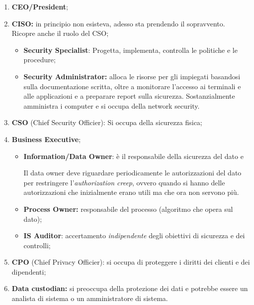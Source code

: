 \begin{enumerate}
  \item \textbf{CEO/President};
  \item \textbf{CISO:} in principio non esisteva, adesso sta prendendo il
  sopravvento. Ricopre anche il ruolo del CSO;
  \begin{itemize}
        \item \textbf{Security Specialist}: Progetta, implementa,
        controlla le politiche e le procedure;
        \item \textbf{Security Administrator:} alloca le risorse per gli
        impiegati basandosi sulla documentazione scritta, oltre a monitorare
        l'accesso ai terminali e alle applicazioni e a preparare report sulla
        sicurezza. Sostanzialmente amministra i computer e si occupa
        della network security.
  \end{itemize}
  \item \textbf{CSO} (Chief Security Officier): Si occupa della
  sicurezza fisica;
  \item \textbf{Business Executive};
  \begin{itemize}
  \item \textbf{Information/Data Owner}:
  è il responsabile della sicurezza del dato e


  Il data owner deve riguardare periodicamente le autorizzazioni del dato
  per restringere l'\textit{authorization creep}, ovvero quando si hanno
  delle autorizzazioni che inizialmente erano utili ma che ora non servono più.
  \item \textbf{Process Owner:} responsabile del processo (algoritmo che opera
  sul dato);
  \item \textbf{IS Auditor}: accertamento \emph{indipendente} degli
  obiettivi di sicurezza e dei controlli;
  \end{itemize}
  \item \textbf{CPO} (Chief Privacy Officier): si occupa di proteggere
  i diritti dei clienti e dei dipendenti;
  \item \textbf{Data custodian:} si preoccupa della protezione dei dati e
  potrebbe essere un analista di sistema o un amministratore di sistema.
\end{enumerate}

